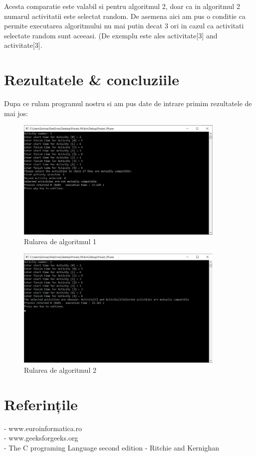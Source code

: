 \documentclass[12pt]{article}
\begin{document}
{Acesta comparatie este valabil si pentru algoritmul 2, doar ca in algoritmul 2 numarul activitatii este selectat random. De asemena aici am pus o conditie ca permite executarea algoritmului nu mai putin decat 3 ori in cazul ca activitati selectate random sunt aceeasi. (De exemplu este ales activitate[3] and activitate[3].


\section{Rezultatele & concluziile} 
Dupa ce rulam programul nostru si am pus date de intrare primim rezultatele de mai jos:

\begin{figure}[htp]
    \centering
    \includegraphics[width=10cm]{image1.png}
    \caption{Rularea de algoritmul 1}
    \label{fig:image1}
\end{figure}

\begin{figure}[htp]
    \centering
    \includegraphics[width=10cm]{image2.png}
    \caption{Rularea de algoritmul 2}
    \label{fig:image2}
\end{figure}






\section{Referințile}


- www.euroinformatica.ro \\
- www.geeksforgeeks.org \\
- The C programing Language second edition - Ritchie and Kernighan



}
\end{document}
